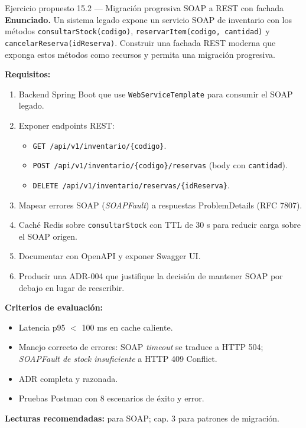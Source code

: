 \documentclass[11pt,a4paper,openany]{book}
\begin{document}
\begin{cajaejercicio}{Ejercicio propuesto 15.2 --- Migración progresiva SOAP a REST con fachada}
\textbf{Enunciado.} Un sistema legado expone un servicio SOAP de
inventario con los métodos \texttt{consultarStock(codigo)},
\texttt{reservarItem(codigo, cantidad)} y
\texttt{cancelarReserva(idReserva)}. Construir una fachada REST
moderna que exponga estos métodos como recursos y permita una
migración progresiva.

\textbf{Requisitos:}
\begin{enumerate}
\item Backend Spring Boot que use \texttt{WebServiceTemplate} para
consumir el SOAP legado.
\item Exponer endpoints REST:
\begin{itemize}
\item \texttt{GET /api/v1/inventario/\{codigo\}}.
\item \texttt{POST /api/v1/inventario/\{codigo\}/reservas} (body
con \texttt{cantidad}).
\item \texttt{DELETE /api/v1/inventario/reservas/\{idReserva\}}.
\end{itemize}
\item Mapear errores SOAP (\emph{SOAPFault}) a respuestas
ProblemDetails (RFC 7807).
\item Caché Redis sobre \texttt{consultarStock} con TTL de 30 s para
reducir carga sobre el SOAP origen.
\item Documentar con OpenAPI y exponer Swagger UI.
\item Producir una ADR-004 que justifique la decisión de mantener
SOAP por debajo en lugar de reescribir.
\end{enumerate}

\textbf{Criterios de evaluación:}
\begin{itemize}
\item Latencia p95 $<$ 100 ms en cache caliente.
\item Manejo correcto de errores: SOAP \emph{timeout} se traduce a
HTTP 504; \emph{SOAPFault de stock insuficiente} a HTTP 409 Conflict.
\item ADR completa y razonada.
\item Pruebas Postman con 8 escenarios de éxito y error.
\end{itemize}

\textbf{Lecturas recomendadas:} \cite{alonso2010webservice} para
SOAP; \cite{newman2021building} cap. 3 para patrones de migración.
\end{cajaejercicio}
\end{document}
